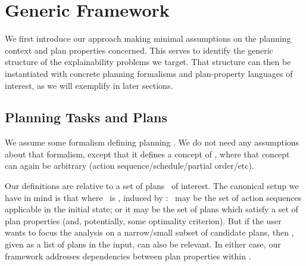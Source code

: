 \section{Generic Framework}
\label{framework}

We first introduce our approach making minimal assumptions on the
planning context and plan properties concerned. This serves to
identify the generic structure of the explainability problems we
target. That structure can then be instantiated with concrete planning
formalisms and plan-property languages of interest, as we will
exemplify in later sections.




\subsection{Planning Tasks and Plans}

We assume some formalism defining planning  \task. We
do not need any assumptions about that formalism, except that it
defines a concept of  \plan, where that concept can
again be arbitrary (action sequence/schedule/partial order/etc). 

Our definitions are relative to a set of plans \plans\ of
interest. The canonical setup we have in mind is that where \plans\ is
, induced by \task: \plans\ may be the set of action
sequences applicable in the initial state; or it may be the set of
plans which satisfy a set of  plan properties (and,
potentially, some optimality criterion). But if the user wants to
focus the analysis on a narrow/small subset of candidate plans, then
 \plans, given as a list of plans in the input, can
also be relevant. In either case, our framework addresses dependencies
between  plan properties within \plans.
%
%





